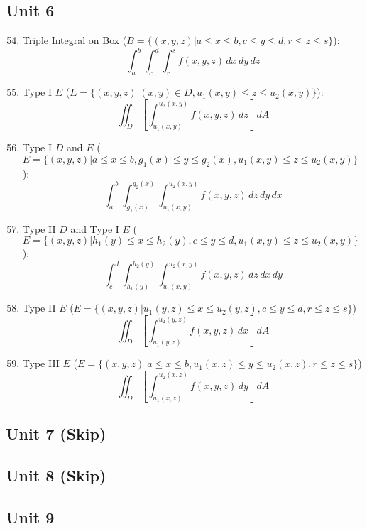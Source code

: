 \documentclass[12pt]{article}
\begin{document}
\subsection{Unit 6}

\begin{enumerate}
    \setcounter{enumi}{53}

  \item Triple Integral on Box ($B=\{(x,y,z)\big|a\leq x\leq b, c\leq y\leq d, r\leq z\leq s\}$):
    $$\int_a^b\int_c^d\int_r^sf(x,y,z)\,dx\,dy\,dz$$

  \item Type I $E$ ($E=\{(x,y,z)\big|(x,y)\in D, u_1(x,y)\leq z\leq u_2(x,y)\}$): 
    $$\iint_D \left[\int_{u_1(x,y)}^{u_2(x,y)}f(x,y,z)\,dz\right]\,dA$$

  \item Type I $D$ and $E$ ($E=\{(x,y,z)\big| a\leq x\leq b, g_1(x)\leq y\leq g_2(x), u_1(x,y)\leq z\leq u_2(x,y)\}$): 
    $$\int_a^b\int_{g_1(x)}^{g_2(x)}\int_{u_1(x,y)}^{u_2(x,y)}f(x,y,z)\,dz\,dy\,dx$$

  \item Type II $D$ and Type I $E$ ($E=\{(x,y,z)\big| h_1(y)\leq x\leq h_2(y), c\leq y\leq d, u_1(x,y)\leq z\leq u_2(x,y)\}$): 
    $$\int_c^d\int_{h_1(y)}^{h_2(y)}\int_{u_1(x,y)}^{u_2(x,y)}f(x,y,z)\,dz\,dx\,dy$$

  \item Type II $E$ ($E=\{(x,y,z)\big|u_1(y,z)\leq x\leq u_2(y,z), c\leq y\leq d,r\leq z\leq s\}$)
    $$\iint_D \left[\int_{u_1(y,z)}^{u_2(y,z)} f(x,y,z)\,dx\right]\,dA$$

  \item Type III $E$ ($E=\{(x,y,z)\big|a\leq x\leq b, u_1(x,z)\leq y\leq u_2(x,z), r\leq z\leq s\}$)
    $$\iint_D\left[\int_{u_1(x,z)}^{u_2(x,z)}f(x,y,z)\,dy\right]\,dA$$

\end{enumerate}

\subsection{Unit 7 (Skip)}

\subsection{Unit 8 (Skip)}

\subsection{Unit 9}
\end{document}
